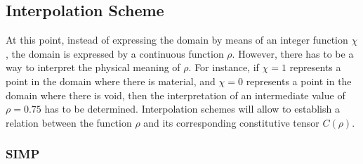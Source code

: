 \subsection{Interpolation Scheme}
At this point, instead of expressing the domain by means of an integer function $ \chi $, the domain is expressed by a continuous function $\rho$. However, there has to be a way to interpret the physical meaning of $\rho$. For instance, if $ \chi=1 $ represents a point in the domain where there is material, and  $ \chi=0 $ represents a point in the domain where there is void, then the interpretation of an intermediate value of $ \rho=0.75 $ has to be determined. Interpolation schemes will allow to establish a relation between the function $\rho$ and its corresponding constitutive tensor $C(\rho)$. 
\subsubsection{SIMP}

